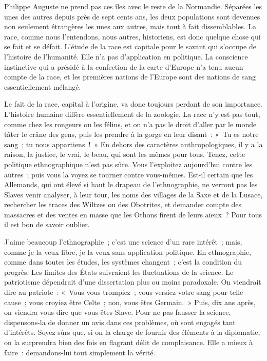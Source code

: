 \documentclass[french,twoside]{book} %
\newcommand\orgName[1]{#1}
\newcommand\persName[1]{#1}
\newcommand\placeName[1]{#1}
\begin{document}
{\persName Philippe Auguste} ne prend pas ces îles avec le reste de la {\placeName Normandie}. Séparées les unes des autres depuis près de sept cents ans, les deux populations sont devenues non seulement étrangères les unes aux autres, mais tout à fait dissemblables. La race, comme nous l’entendons, nous autres, historiens, est donc quelque chose qui se fait et se défait. L’étude de la race est capitale pour le savant qui s’occupe de l’histoire de l’humanité. Elle n’a pas d’application en politique. La conscience instinctive qui a présidé à la confection de la carte d’{\placeName Europe} n’a tenu aucun compte de la race, et les premières nations de l’{\placeName Europe} sont des nations de sang essentiellement mélangé.\par
Le fait de la race, capital à l’origine, va donc toujours perdant de son importance. L’histoire humaine diffère essentiellement de la zoologie. La race n’y est pas tout, comme chez les rongeurs ou les félins, et on n’a pas le droit d’aller par le monde tâter le crâne des gens, puis les prendre à la gorge en leur disant : « Tu es notre sang ; tu nous appartiens ! » En dehors des caractères anthropologiques, il y a la raison, la justice, le vrai, le beau, qui sont les mêmes pour tous. Tenez, cette politique ethnographique n’est pas sûre. Vous l’exploitez aujourd’hui contre les autres ; puis vous la voyez se tourner contre vous-mêmes. Est-il certain que les {\orgName Allemands}, qui ont élevé si haut le drapeau de l’ethnographie, ne verront pas les {\orgName Slaves} venir analyser, à leur tour, les noms des villages de la {\placeName Saxe} et de la {\placeName Lusace}, rechercher les traces des {\orgName Wiltzes} ou des {\orgName Obotrites}, et demander compte des massacres et des ventes en masse que les {\orgName Othons} firent de leurs aïeux ? Pour tous il est bon de savoir oublier.\par
J’aime beaucoup l’ethnographie ; c’est une science d’un rare intérêt ; mais, comme je la veux libre, je la veux sans application politique. En ethnographie, comme dans toutes les études, les systèmes changent ; c’est la condition du progrès. Les limites des États suivraient les fluctuations de la science. Le patriotisme dépendrait d’une dissertation plus ou moins paradoxale. On viendrait dire au patriote : « Vous vous trompiez ; vous versiez votre sang pour telle cause ; vous croyiez être Celte ; non, vous êtes Germain. » Puis, dix ans après, on viendra vous dire que vous êtes Slave. Pour ne pas fausser la science, dispensons-la de donner un avis dans ces problèmes, où sont engagés tant d’intérêts. Soyez sûrs que, si on la charge de fournir des éléments à la diplomatie, on la surprendra bien des fois en flagrant délit de complaisance. Elle a mieux à faire : demandons-lui tout simplement la vérité.
\end{document}
